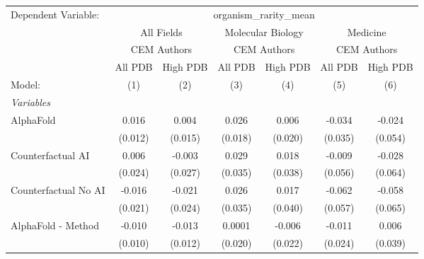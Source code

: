 \begingroup
\centering
\begin{tabular}{lcccccc}
   \tabularnewline \midrule \midrule
   Dependent Variable: & \multicolumn{6}{c}{organism\_rarity\_mean}\\
 & \multicolumn{2}{c}{All Fields} & \multicolumn{2}{c}{Molecular Biology} & \multicolumn{2}{c}{Medicine} \\
\cmidrule(lr){2-3} \cmidrule(lr){4-5} \cmidrule(lr){6-7}
 & \multicolumn{2}{c}{CEM Authors} & \multicolumn{2}{c}{CEM Authors} & \multicolumn{2}{c}{CEM Authors} \\
\cmidrule(lr){2-3} \cmidrule(lr){4-5} \cmidrule(lr){6-7}
 & \multicolumn{1}{c}{All PDB} & \multicolumn{1}{c}{High PDB} & \multicolumn{1}{c}{All PDB} & \multicolumn{1}{c}{High PDB} & \multicolumn{1}{c}{All PDB} & \multicolumn{1}{c}{High PDB} \\
\cmidrule(lr){2-2} \cmidrule(lr){3-3} \cmidrule(lr){4-4} \cmidrule(lr){5-5} \cmidrule(lr){6-6} \cmidrule(lr){7-7}
   Model:                                                     & (1)     & (2)          & (3)          & (4)          & (5)     & (6)\\  
   \midrule
   \emph{Variables}\\
   AlphaFold                                                  & 0.016   & 0.004        & 0.026        & 0.006        & -0.034  & -0.024\\   
                                                              & (0.012) & (0.015)      & (0.018)      & (0.020)      & (0.035) & (0.054)\\   
   Counterfactual AI                                          & 0.006   & -0.003       & 0.029        & 0.018        & -0.009  & -0.028\\   
                                                              & (0.024) & (0.027)      & (0.035)      & (0.038)      & (0.056) & (0.064)\\   
   Counterfactual No AI                                       & -0.016  & -0.021       & 0.026        & 0.017        & -0.062  & -0.058\\   
                                                              & (0.021) & (0.024)      & (0.035)      & (0.040)      & (0.057) & (0.065)\\   
   AlphaFold - Method                                         & -0.010  & -0.013       & 0.0001       & -0.006       & -0.011  & 0.006\\   
                                                              & (0.010) & (0.012)      & (0.020)      & (0.022)      & (0.024) & (0.039)\\   

\end{tabular}
